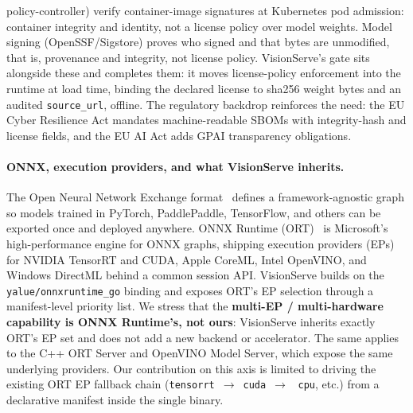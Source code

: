 policy-controller) verify container-image signatures at Kubernetes pod
admission: container integrity and identity, not a license policy over
model weights. Model signing (OpenSSF/Sigstore) proves who signed and that bytes
are unmodified, that is, provenance and integrity, not license policy. VisionServe's gate
sits alongside these and completes them: it moves license-policy enforcement into
the runtime at load time, binding the declared license to sha256 weight bytes and
an audited \texttt{source\_url}, offline. The regulatory backdrop reinforces the
need: the EU Cyber Resilience Act mandates machine-readable SBOMs with
integrity-hash and license fields, and the EU AI Act adds GPAI transparency
obligations.

\paragraph{ONNX, execution providers, and what VisionServe inherits.}
The Open Neural Network Exchange format~\cite{onnx2019} defines a
framework-agnostic graph so models trained in PyTorch, PaddlePaddle,
TensorFlow, and others can be exported once and deployed anywhere.
ONNX Runtime (ORT)~\cite{onnxruntime} is Microsoft's high-performance engine
for ONNX graphs, shipping execution providers (EPs) for NVIDIA TensorRT and
CUDA, Apple CoreML, Intel OpenVINO, and Windows DirectML behind a common
session API.
VisionServe builds on the \texttt{yalue/onnxruntime\_go} binding and exposes
ORT's EP selection through a manifest-level priority list.
We stress that the \textbf{multi-EP / multi-hardware capability is ONNX
Runtime's, not ours}: VisionServe inherits exactly ORT's EP set and
does not add a new backend or accelerator. The same applies to the C++ ORT
Server and OpenVINO Model Server, which expose the same underlying providers.
Our contribution on this axis is limited to driving the existing ORT EP
fallback chain (\texttt{tensorrt}~$\rightarrow$~\texttt{cuda}~$\rightarrow$~
\texttt{cpu}, etc.) from a declarative manifest inside the single binary.

